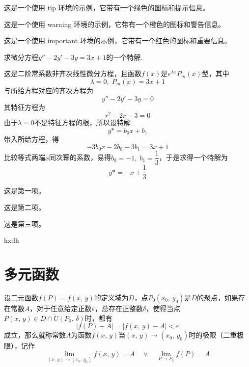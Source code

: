 \documentclass[12pt, a4paper, oneside, UTF8]{ctexbook}
\begin{document}
	
	\begin{tip}
		这是一个使用 tip 环境的示例，它带有一个绿色的图标和提示信息。
	\end{tip}
	
	
	\begin{warning}
		这是一个使用 warning 环境的示例，它带有一个橙色的图标和警告信息。
	\end{warning}

	
	\begin{important}
		这是一个使用 important 环境的示例，它带有一个红色的图标和重要信息。
	\end{important}
	\begin{example}
		求微分方程$y''-2y'-3y=3x+1$的一个特解.
	\end{example}
	\begin{solution}
		这是二阶常系数非齐次线性微分方程，且函数$f(x)$是$e^{\lambda{x}}P_m(x)$型，其中
		\[
		\lambda = 0,\;P_m(x) = 3x+1
		\]
		与所给方程对应的齐次方程为
		\[
		y''-2y'-3y=0
		\]
		其特征方程为
		\[
		r^2-2r-3 = 0
		\]
		由于$\lambda = 0$不是特征方程的根，所以设特解
		\[
		y* = b_0 x + b_1
		\]
		带入所给方程，得
		\[
		-3b_0 x - 2b_0 - 3b_1 = 3x+1
		\]
		比较等式两端$x$同次幂的系数，易得$b_0 = -1,\;b_1 = \dfrac{1}{3}$，于是求得一个特解为
		\[
		y* = -x + \frac{1}{3}
		\]
	\end{solution}
	\begin{introduction}
		\item 这是第一项。
		\item 这是第二项。
		\item 这是第三项。
	\end{introduction}
	\begin{solution}
		hxdh
	\end{solution}
	
	\section{多元函数}
	\begin{defn}
		设二元函数$f(P) = f(x,\,y)$的定义域为$D$，点$P_0(x_0,\,y_0)$是$D$的聚点，如果存在常数$A$，对于任意给定正数$\varepsilon$，总存在正整数$\delta$，使得当点$P(x,\,y) \in D \cap \mathring{U}(P_0,\,\delta)$时，都有
		\[
		|f(P)-A| = |f(x,\,y) - A| < \varepsilon
		\]
		成立，那么就称常数$A$为函数$f(x,\,y)$当$(x,\,y) \to (x_0,\,y_0)$时的极限（二重极限），记作
		\[
		\lim_{(x,\,y) \to (x_0,\,y_0)}f(x,\,y) = A \quad \lor \quad \lim_{P \to P_0}f(P) = A
		\]
	\end{defn}
	
\end{document}
